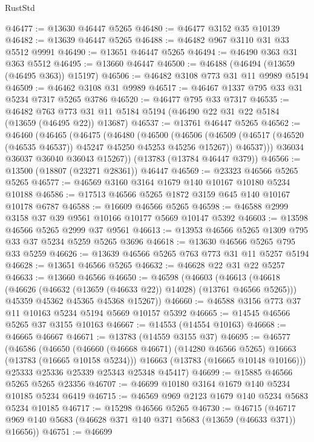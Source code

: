 \begin{lexlean}{RustStd}
\begin{coremodule}
@46477 := @13630 @46447 @5265
@46480 := @46477 @3152 @35 @10139
@46482 := @13639 @46447 @5265
@46488 := @46482 @967 @3110 @31 @33 @5512 @9991
@46490 := @13651 @46447 @5265
@46494 := @46490 @363 @31 @363 @5512
@46495 := @13660 @46447
@46500 := @46488 (@46494 (@13659 (@46495 @363)) @15197)
@46506 := @46482 @3108 @773 @31 @11 @9989 @5194
@46509 := @46462 @3108 @31 @9989
@46517 := @46467 @1337 @795 @33 @31 @5234 @7317 @5265 @3786
@46520 := @46477 @795 @33 @7317
@46535 := @46482
    @763
    @773
    @31
    @11
    @5184
    @5194
    (@46490 @22 @31 @22 @5184 (@13659 (@46495 @22)) @13687)
@46537 := @13761 @46447 @5265
@46562 := @46460
    (@46465
      (@46475
        (@46480
          (@46500
            (@46506
              (@46509 (@46517 (@46520 (@46535 @46537)) @45247 @45250 @45253 @45256 @15267))
              @46537)))
        @36034
        @36037
        @36040
        @36043
        @15267))
    (@13783 (@13784 @46447 @379))
@46566 := @13500 (@18807 (@23271 @28361)) @46447
@46569 := @23323 @46566 @5265 @5265
@46577 := @46569 @3160 @3164 @1679 @140 @10167 @10180 @5234 @10188
@46586 := @17513 @46566 @5265 @1872 @3159 @645 @140 @10167 @10178 @6787
@46588 := @16609 @46566 @5265
@46598 := @46588 @2999 @3158 @37 @39 @9561 @10166 @10177 @5669 @10147 @5392
@46603 := @13598 @46566 @5265 @2999 @37 @9561
@46613 := @13953 @46566 @5265 @1309 @795 @33 @37 @5234 @5259 @5265 @3696
@46618 := @13630 @46566 @5265 @795 @33 @5259
@46626 := @13639 @46566 @5265 @763 @773 @31 @11 @5257 @5194
@46628 := @13651 @46566 @5265
@46632 := @46628 @22 @31 @22 @5257
@46633 := @13660 @46566
@46650 := @46598
    (@46603
      (@46613
        (@46618 (@46626 (@46632 (@13659 (@46633 @22)) @14028) (@13761 @46566 @5265)))
        @45359
        @45362
        @45365
        @45368
        @15267))
@46660 := @46588 @3156 @773 @37 @11 @10163 @5234 @5194 @5669 @10157 @5392
@46665 := @14545 @46566 @5265 @37 @3155 @10163
@46667 := @14553 (@14554 @10163)
@46668 := @46665 @46667
@46671 := @13783 (@14559 @3155 @37)
@46695 := @46577
    (@46586
      (@46650
        (@46660 (@46668 @46671) (@14280 @46566 @5265) @16663 (@13783 (@16665 @10158 @5234)))
        @16663
        (@13783 (@16665 @10148 @10166)))
      @25333
      @25336
      @25339
      @25343
      @25348
      @45417)
@46699 := @15885 @46566 @5265 @5265 @23356
@46707 := @46699 @10180 @3164 @1679 @140 @5234 @10185 @5234 @6419
@46715 := @46569 @969 @2123 @1679 @140 @5234 @5683 @5234 @10185
@46717 := @15298 @46566 @5265
@46730 := @46715
    (@46717 @969 @140 @5683 (@46628 @371 @140 @371 @5683 (@13659 (@46633 @371)) @16656))
@46751 := @46699

\end{coremodule}
\end{lexlean}
